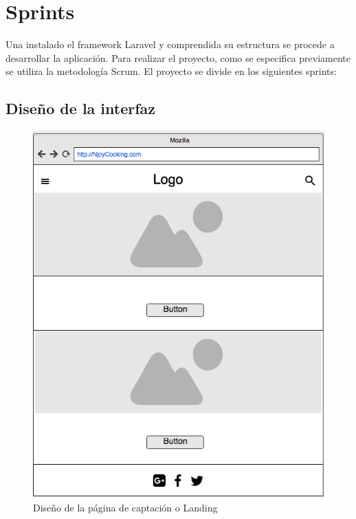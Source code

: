 \vspace{5 mm}

\section{Sprints}

Una instalado el framework Laravel y comprendida su estructura se procede a desarrollar la aplicación. Para realizar el proyecto, como se especifica previamente se utiliza la metodología Scrum. El proyecto se divide en los siguientes sprints:


\subsection{Diseño de la interfaz}

\begin{figure}
\begin{center}
\includegraphics[width=1.0\textwidth]{imagenes/landing.png}
\caption{Diseño de la página de captación o Landing}
\label{landing}
\end{center}
\end{figure}

